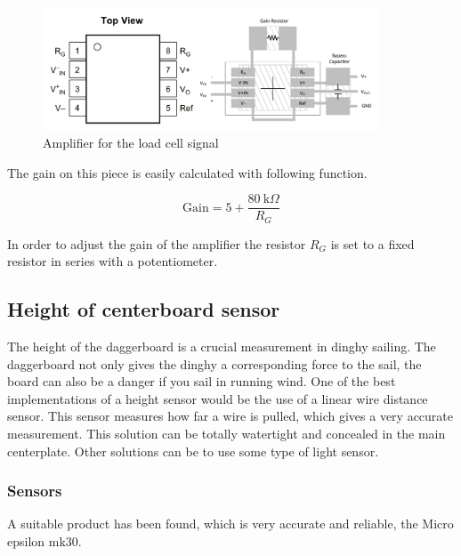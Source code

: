 \begin{figure}[H]
\begin{center}
	\includegraphics[width = 10cm]{Figures/INA126_pinout.png}
	\caption{Amplifier for the load cell signal}
	\label{INA126}
\end{center}
\end{figure}

The gain on this piece is easily calculated with following function.  

\begin{equation}%
\textrm{Gain} = 5 + \frac{80~\textrm{k}\Omega}{R_G}
\end{equation}

In order to adjust the gain of the amplifier the resistor $R_G$ is set to a fixed resistor in series with a potentiometer.


\subsection{Height of centerboard sensor}
The height of the daggerboard is a crucial measurement in dinghy sailing. The daggerboard not only gives the dinghy a corresponding force to the sail, the board can also be a danger if you sail in running wind. One of the best implementations of a height sensor would be the use of a linear wire distance sensor. This sensor measures how far a wire is pulled, which gives a very accurate measurement. This solution can be totally watertight and concealed in the main centerplate. Other solutions can be to use some type of light sensor. 

\subsubsection{Sensors}

A suitable product has been found, which is very accurate and reliable, the Micro epsilon mk30\cite{micro-epsilon-mk30}.


